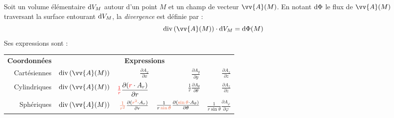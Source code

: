 \documentclass[11pt,a4paper,fleqn,pdftex]{report}
\begin{document}
\begin{dfn}[Divergence]
   Soit un volume élémentaire $\mathrm{d} V_M$ autour d'un point $M$ et un champ de vecteur $\vv{A}(M)$. En notant $\mathrm{d} \Phi$ le flux de $\vv{A}(M)$ traversant la surface entourant $\mathrm{d} V_M$, la \emph{divergence} est définie par :
   \begin{equation}
   \diverg[\vv{A}(M)] \cdot \d V_M = \d{}\Phi (M)
   \end{equation}
   Ses expressions sont :
   \begin{center}
   \begin{tabular}{r r@{$\:\: = \:\:$}r@{$ + $}r@{$ + $}r}
      \textbf{Coordonnées} & \multicolumn{4}{c}{\textbf{Expressions}} \\
      Cartésiennes        & $\diverg[\vv{A}(M)] $ &  $\frac{\partial A_x}{\partial x}$ & $\frac{\partial A_y}{\partial y}$ & $\frac{\partial A_z}{\partial z}$\\
      Cylindriques        & $\diverg[\vv{A}(M)] $ &  $\textcolor{couleurImp}{\frac{1}{r}} \dfrac{\partial ( \textcolor{couleurImp}{r}\cdot A_r)}{\partial r}$ & $\frac{1}{r}\frac{\partial A_\theta}{\partial \theta}$ & $\frac{\partial A_z}{\partial z}$ \\
      Sphériques          & $\diverg[\vv{A}(M)] $ &  $\textcolor{couleur2}{\frac{1}{r^2}}\frac{\partial ( \textcolor{couleur2}{r^2}\cdot A_r)}{\partial r}$ & $\frac{1}{r \,\textcolor{couleur2}{\sin \theta}}\frac{\partial (\textcolor{couleur2}{\sin \theta } \cdot A_\theta)}{\partial \theta}$ & $\frac{1}{r\sin \theta}\frac{\partial A_\varphi}{\partial \varphi}$
   \end{tabular}
   \end{center}
\end{dfn}

\end{document}
